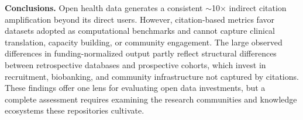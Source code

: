 \documentclass[11pt]{article}
\begin{document}
{\textbf{Conclusions.}
Open health data generates a consistent ${\sim}$10$\times$ indirect citation amplification beyond its direct users. However, citation-based metrics favor datasets adopted as computational benchmarks and cannot capture clinical translation, capacity building, or community engagement. The large observed differences in funding-normalized output partly reflect structural differences between retrospective databases and prospective cohorts, which invest in recruitment, biobanking, and community infrastructure not captured by citations. These findings offer one lens for evaluating open data investments, but a complete assessment requires examining the research communities and knowledge ecosystems these repositories cultivate.
}
\end{document}
